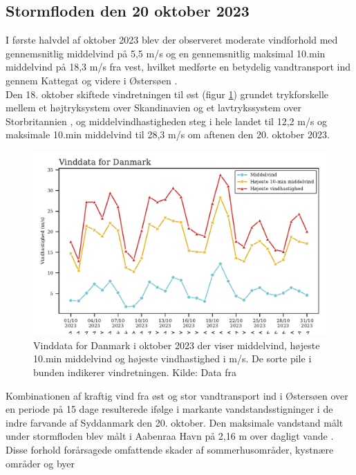 \subsection{Stormfloden den 20 oktober 2023} \label{Afsnit: Stormfloden den 20 oktober 2023}
I første halvdel af oktober 2023 blev der observeret moderate vindforhold med gennemsnitlig middelvind på 5,5 m/s og en gennemsnitlig maksimal 10.min middelvind på 18,3 m/s fra vest, hvilket medførte en betydelig vandtransport ind gennem Kattegat og videre i Østersøen \citep{dmi_vejrarkiv}. \\
Den 18. oktober skiftede vindretningen til øst (figur \ref{Figur: Vinddata Danmark}) grundet trykforskelle mellem et højtryksystem over Skandinavien og et lavtrykssystem over Storbritannien \citep{kiesel_brief_2024}, og middelvindhastigheden steg i hele landet til 12,2 m/s og maksimale 10.min middelvind til 28,3 m/s om aftenen den 20. oktober 2023. 
\begin{figure} [H]
    \centering
    \includegraphics[width=0.8\linewidth]{images/vinddata_grafer/Danmark_vinddata.pdf}
    \caption{Vinddata for Danmark i oktober 2023 der viser middelvind, højeste 10.min middelvind og højeste vindhastighed i m/s. De sorte pile i bunden indikerer vindretningen. Kilde: Data fra \cite{dmi_vejrarkiv} }
    \label{Figur: Vinddata Danmark}
\end{figure}

Kombinationen af kraftig vind fra øst og stor vandtransport ind i Østersøen over en periode på 15 dage resulterede ifølge \cite{kystdirektoratet_stormflod2023} i markante vandstandsstigninger i de indre farvande af Syddanmark den 20. oktober. Den maksimale vandstand målt under stormfloden blev målt i Aabenraa Havn på 2,16 m over dagligt vande \citep{damberg_vaerste_2023}. Disse forhold forårsagede omfattende skader af sommerhusområder, kystnære områder og byer \citep{kystdirektoratet_stormflod2023, naturskaderadet_anmeldelser_2023}




